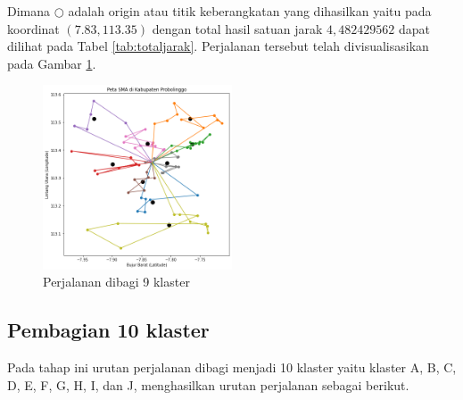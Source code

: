 Dimana $\bigcirc$ adalah origin atau titik keberangkatan yang dihasilkan yaitu pada koordinat $(7.83, 113.35)$ dengan total hasil satuan jarak $4,482429562$ dapat dilihat pada Tabel \ref{tab:totaljarak}. Perjalanan tersebut telah divisualisasikan pada Gambar \ref{fig:hasil_mtsp9}.

\begin{figure}[H]
\centering
\includegraphics[width=0.5\textwidth]{Gambar/hasil_mtsp/9}
\caption{Perjalanan dibagi 9 klaster}
\label{fig:hasil_mtsp9}
\end{figure}

\subsection{Pembagian 10 klaster}

Pada tahap ini urutan perjalanan dibagi menjadi 10 klaster yaitu klaster A, B, C, D, E, F, G, H, I, dan J, menghasilkan urutan perjalanan sebagai berikut.

